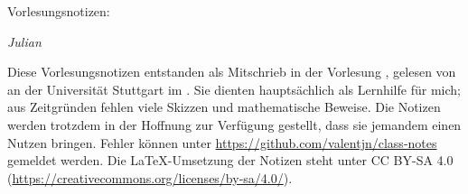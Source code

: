 

\ihead{\vorlesung{}}
\ifoot{\vspace{-1.5mm}\headmark}

\thispagestyle{empty}
\vspace*{1em}

{%
  \huge%
  Vorlesungsnotizen:
  \ifdef{\vorlesungInLectureHeading}{%
    \vorlesungInLectureHeading{}%
  }{%
    \vorlesung{}%
  }%
  \par%
}
\vspace*{1em}

\emph{Julian }

\vspace*{1em}

Diese Vorlesungsnotizen entstanden als Mitschrieb in der Vorlesung \vorlesung{},
gelesen von \dozent{} an der Universität Stuttgart im \semester{}.
Sie dienten hauptsächlich als Lernhilfe für mich;
aus Zeitgründen fehlen viele Skizzen und mathematische Beweise.
Die Notizen werden trotzdem in der Hoffnung zur Verfügung gestellt,
dass sie jemandem einen Nutzen bringen.
Fehler können unter \url{https://github.com/valentjn/class-notes} gemeldet werden.
Die \LaTeX{}-Umsetzung der Notizen steht unter CC BY-SA 4.0
(\url{https://creativecommons.org/licenses/by-sa/4.0/}).

{%
  \renewcommand*{\chaptermarkformat}{}

  \tableofcontents%
}

\pagebreak


